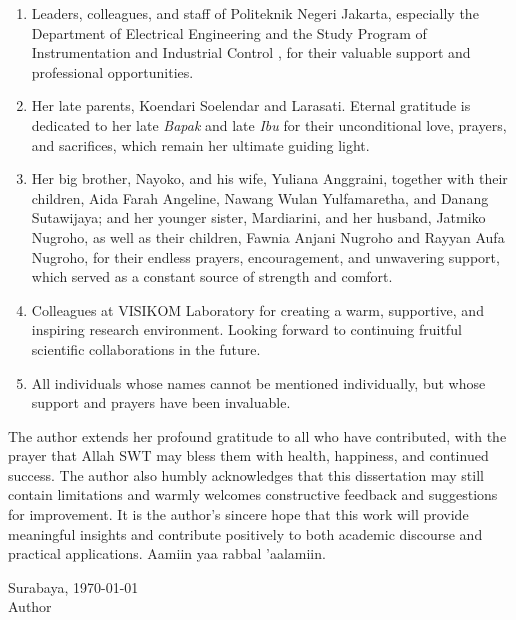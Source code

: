 \begin{enumerate}
	\item Leaders, colleagues, and staff of Politeknik Negeri Jakarta, especially the Department of Electrical Engineering and the Study Program of Instrumentation and Industrial Control , for their valuable support and professional opportunities.
	
	\item Her late parents, Koendari Soelendar and Larasati. Eternal gratitude is dedicated to her late \textit{Bapak} and late \textit{Ibu} for their unconditional love, prayers, and sacrifices, which remain her ultimate guiding light.
	
	\item Her big brother, Nayoko, and his wife, Yuliana Anggraini, together with their children, Aida Farah Angeline, Nawang Wulan Yulfamaretha, and Danang Sutawijaya; and her younger sister, Mardiarini, and her husband, Jatmiko Nugroho, as well as their children, Fawnia Anjani Nugroho and Rayyan Aufa Nugroho, for their endless prayers, encouragement, and unwavering support, which served as a constant source of strength and comfort.
	
	\item Colleagues at VISIKOM Laboratory for creating a warm, supportive, and inspiring research environment. Looking forward to continuing fruitful scientific collaborations in the future.
	
	\item All individuals whose names cannot be mentioned individually, but whose support and prayers have been invaluable.
\end{enumerate}

The author extends her profound gratitude to all who have contributed, with the prayer that Allah SWT may bless them with health, happiness, and continued success. The author also humbly acknowledges that this dissertation may still contain limitations and warmly welcomes constructive feedback and suggestions for improvement. It is the author’s sincere hope that this work will provide meaningful insights and contribute positively to both academic discourse and practical applications. Aamiin yaa rabbal ’aalamiin.

\nopagebreak
\vspace{2ex}
\begin{flushright}
	\begin{minipage}{5cm}
		\centering
		Surabaya, \today \\[4ex]
		Author
	\end{minipage}
\end{flushright}